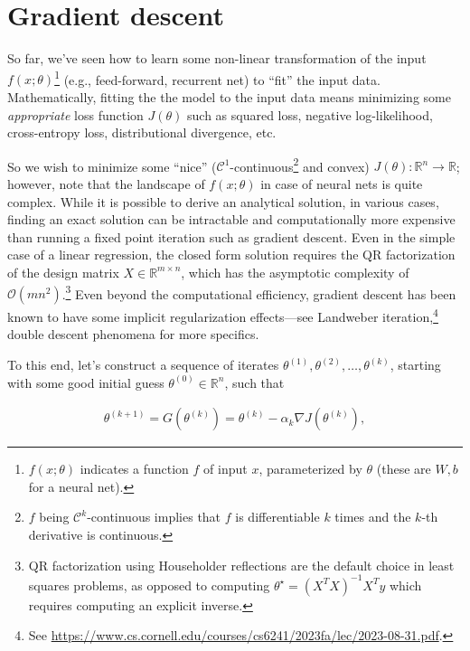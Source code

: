 \section{Gradient descent}
\label{sec:1}

So far, we've seen how to learn some non-linear transformation of the input $f(x; \theta)$\footnote{$f(x; \theta)$ indicates a function $f$ of input $x$, parameterized by $\theta$ (these are $W, b$ for a neural net).} (e.g., feed-forward, recurrent net) to ``fit'' the input data. Mathematically, fitting the the model to the input data means minimizing some \textit{appropriate} loss function $J(\theta)$ such as squared loss, negative log-likelihood, cross-entropy loss, distributional divergence, etc.

So we wish to minimize some ``nice'' ($\mathscr{C}^1$-continuous\footnote{$f$ being $\mathscr{C}^k$-continuous implies that $f$ is differentiable $k$ times and the $k$-th derivative is continuous.} and convex) $J(\theta): \mathbb{R}^n \rightarrow \mathbb{R}$; however, note that the landscape of $f(x; \theta)$ in case of neural nets is quite complex. While it is possible to derive an analytical solution, in various cases, finding an exact solution can be intractable and computationally more expensive than running a fixed point iteration such as gradient descent. Even in the simple case of a linear regression, the closed form solution requires the QR factorization of the design matrix $X \in \mathbb{R}^{m \times n}$, which has the asymptotic complexity of $\mathcal{O}(mn^2)$.\footnote{QR factorization using Householder reflections are the default choice in least squares problems, as opposed to computing $\theta^\star = (X^TX)^{-1}X^T y$ which requires computing an explicit inverse.} Even beyond the computational efficiency, gradient descent has been known to have some implicit regularization effects---see Landweber iteration,\footnote{See \url{https://www.cs.cornell.edu/courses/cs6241/2023fa/lec/2023-08-31.pdf}.} double descent phenomena \cite{belkin2019reconciling} for more specifics.

To this end, let's construct a sequence of iterates $\theta^{(1)}, \theta^{(2)}, \dotsc, \theta^{(k)}$, starting with some good initial guess $\theta^{(0)} \in \mathbb{R}^n$, such that

\begin{align}
\label{eq:1}
\theta^{(k+1)} = G\left(\theta^{(k)}\right) = \theta^{(k)} - \alpha_k \nabla J(\theta^{(k)}),
\end{align}

